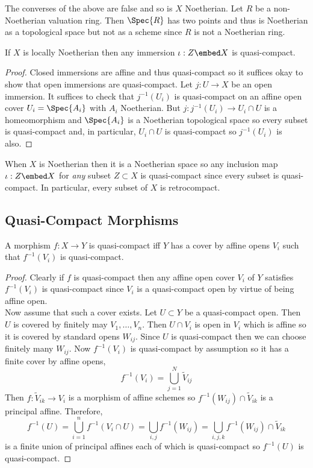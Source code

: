 \documentclass[12pt]{article}
\begin{document}
\begin{rmk}
The converses of the above are false and so is $X$ Noetherian. Let $R$ be a non-Noetherian valuation ring. Then $\Spec{R}$ has two points and thus is Noetherian as a topological space but not as a scheme since $R$ is not a Noetherian ring. 
\end{rmk}

\begin{lemma}
If $X$ is locally Noetherian then any immersion $\iota : Z \embed X$ is quasi-compact.
\end{lemma}

\begin{proof}
Closed immersions are affine and thus quasi-compact so it suffices okay to show that open immersions are quasi-compact. Let $j : U \to X$ be an open immersion. It suffices to check that $j^{-1}(U_i)$ is quasi-compact on an affine open cover $U_i = \Spec{A_i}$ with $A_i$ Noetherian. But $j : j^{-1}(U_i) \to U_i \cap U$ is a homeomorphism and $\Spec{A_i}$ is a Noetherian topological space so every subset is quasi-compact and, in particular, $U_i \cap U$ is quasi-compact so $j^{-1}(U_i)$ is also.
\end{proof}

\begin{rmk}
When $X$ is Noetherian then it is a Noetherian space so any inclusion map $\iota : Z \embed X$ for \textit{any} subset $Z \subset X$ is quasi-compact since every subset is quasi-compact. In particular, every subset of $X$ is retrocompact. 
\end{rmk}

\subsection{Quasi-Compact Morphisms}

\begin{lemma}
A morphism $f : X \to Y$ is quasi-compact iff $Y$ has a cover by affine opens $V_i$ such that $f^{-1}(V_i)$ is quasi-compact.
\end{lemma}

\begin{proof}
Clearly if $f$ is quasi-compact then any affine open cover $V_i$ of $Y$ satisfies $f^{-1}(V_i)$ is quasi-compact since $V_i$ is a quasi-compact open by virtue of being affine open.
\bigskip\\
Now assume that such a cover exists. Let $U \subset Y$ be a quasi-compact open. Then $U$ is covered by finitely may $V_1, \dots, V_n$. Then $U \cap V_i$ is open in $V_i$ which is affine so it is covered by standard opens $W_{ij}$. Since $U$ is quasi-compact then we can choose finitely many $W_{ij}$. Now $f^{-1}(V_i)$ is quasi-compact by assumption so it has a finite cover by affine opens,
\[ f^{-1}(V_i) = \bigcup_{j = 1}^N \tilde{V}_{ij} \]
Then $f : \tilde{V}_{ik} \to V_i$ is a morphism of affine schemes so $f^{-1}(W_{ij}) \cap \tilde{V}_{ik}$ is a principal affine. Therefore,
\[ f^{-1}(U) = \bigcup_{i = 1}^n f^{-1}(V_i \cap U) = \bigcup_{i,j} f^{-1}(W_{ij}) = \bigcup_{i,j,k} f^{-1}(W_{ij}) \cap \tilde{V}_{ik} \]
is a finite union of principal affines each of which is quasi-compact so $f^{-1}(U)$ is quasi-compact. 
\end{proof}
\end{document}
